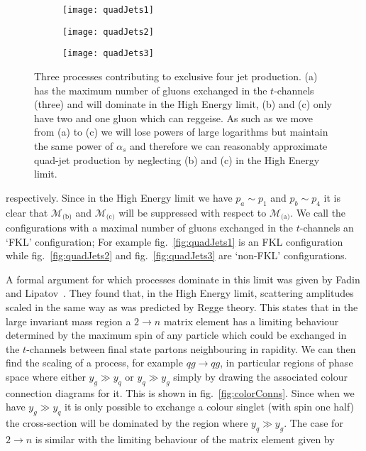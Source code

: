 	\begin{figure}[bth]

		\centering

		\begin{subfigure}[b]{0.31\textwidth}
			\texttt{[image: quadJets1]}
			\caption{}
			\label{fig:quadJets1}
		\end{subfigure}
		\begin{subfigure}[b]{0.31\textwidth}
			\texttt{[image: quadJets2]}
			\caption{}
			\label{fig:quadJets2}
		\end{subfigure}
		\begin{subfigure}[b]{0.31\textwidth}
			\texttt{[image: quadJets3]}
			\caption{}
			\label{fig:quadJets3}
		\end{subfigure}

		\caption{Three processes contributing to exclusive four jet production. (a) has the
		maximum number of gluons exchanged in the $t$-channels (three) and will dominate in the High
		Energy limit, (b) and (c) only have two and one gluon which can reggeise.  As such as we move
		from (a) to (c) we will lose powers of large logarithms but maintain the same power of
		$\alpha_s$ and therefore we can reasonably approximate quad-jet production by neglecting
		(b) and (c) in the High Energy limit.}
		\label{fig:quadJets}
	\end{figure}

	respectively.  Since in the High
	Energy limit we have $p_a\sim p_1$ and $p_b\sim p_4$ it is clear that $\mathcal{M}_{\text{(b)}}$
	and $\mathcal{M}_{\text{(c)}}$ will be suppressed with respect to $\mathcal{M}_{\text{(a)}}$. We call
	the configurations with a maximal number of gluons exchanged in the $t$-channels an `FKL' configuration;
	For example fig.~\eqref{fig:quadJets1} is an FKL configuration while fig.~\eqref{fig:quadJets2} and
	fig.~\eqref{fig:quadJets3} are `non-FKL' configurations.

	A formal argument for which processes dominate in this limit was given by Fadin and
	Lipatov~\cite{Kuraev:1976ge,Balitsky:1978ic}.  They found that, in the High Energy limit, scattering
	amplitudes scaled in the same way as was predicted by Regge theory.  This states that in the
	large invariant mass region a $2\to n$ matrix element has a limiting behaviour determined by
	the maximum spin of any particle which could be exchanged in the $t$-channels between final
	state partons neighbouring in rapidity.  We can then find the scaling of a process, for example
	$qg\to qg$, in particular regions of phase space where either $y_g\gg y_q$ or $y_q\gg y_g$ simply
	by drawing the associated colour connection diagrams for it.  This is shown in fig.~\eqref{fig:colorConns}.
	Since when we have $y_g\gg y_q$ it is only possible to exchange a colour singlet (with spin one half)
	the cross-section will be dominated by the region where $y_q\gg y_g$.  The case for $2\to n$ is similar
	with the limiting behaviour of the matrix element given by

